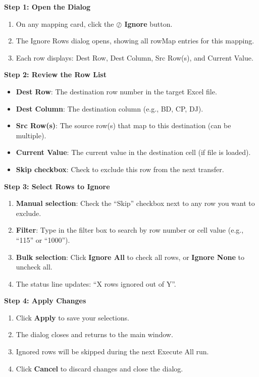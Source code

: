 \documentclass[11pt,a4paper]{article}
\begin{document}
\begin{stepbox}
\textbf{Step 1: Open the Dialog}
\begin{enumerate}[leftmargin=*, itemsep=4pt]
\item On any mapping card, click the \textbf{$\oslash$ Ignore} button.
\item The Ignore Rows dialog opens, showing all rowMap entries for this mapping.
\item Each row displays: Dest Row, Dest Column, Src Row(s), and Current Value.
\end{enumerate}

\textbf{Step 2: Review the Row List}
\begin{itemize}[leftmargin=*, itemsep=2pt]
\item \textbf{Dest Row}: The destination row number in the target Excel file.
\item \textbf{Dest Column}: The destination column (e.g., BD, CP, DJ).
\item \textbf{Src Row(s)}: The source row(s) that map to this destination (can be multiple).
\item \textbf{Current Value}: The current value in the destination cell (if file is loaded).
\item \textbf{Skip checkbox}: Check to exclude this row from the next transfer.
\end{itemize}

\textbf{Step 3: Select Rows to Ignore}
\begin{enumerate}[leftmargin=*, itemsep=4pt]
\item \textbf{Manual selection}: Check the ``Skip'' checkbox next to any row you want to exclude.
\item \textbf{Filter}: Type in the filter box to search by row number or cell value (e.g., ``115'' or ``1000'').
\item \textbf{Bulk selection}: Click \textbf{Ignore All} to check all rows, or \textbf{Ignore None} to uncheck all.
\item The status line updates: ``X rows ignored out of Y''.
\end{enumerate}

\textbf{Step 4: Apply Changes}
\begin{enumerate}[leftmargin=*, itemsep=4pt]
\item Click \textbf{Apply} to save your selections.
\item The dialog closes and returns to the main window.
\item Ignored rows will be skipped during the next Execute All run.
\item Click \textbf{Cancel} to discard changes and close the dialog.
\end{enumerate}


\end{stepbox}
\end{document}
